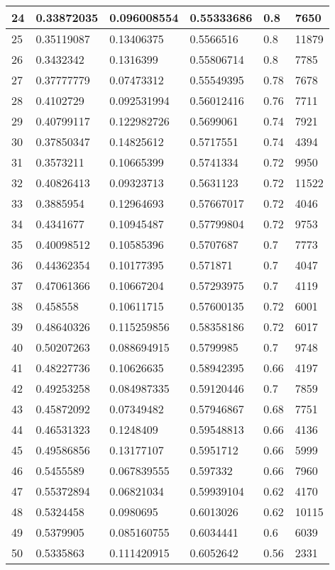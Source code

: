 \begin{longtable}{|l|l|l|l|l|l|}
24 & 0.33872035 & 0.096008554 & 0.55333686 & 0.8 & 7650 \\ \hline 
25 & 0.35119087 & 0.13406375 & 0.5566516 & 0.8 & 11879 \\ \hline 
26 & 0.3432342 & 0.1316399 & 0.55806714 & 0.8 & 7785 \\ \hline 
27 & 0.37777779 & 0.07473312 & 0.55549395 & 0.78 & 7678 \\ \hline 
28 & 0.4102729 & 0.092531994 & 0.56012416 & 0.76 & 7711 \\ \hline 
29 & 0.40799117 & 0.122982726 & 0.5699061 & 0.74 & 7921 \\ \hline 
30 & 0.37850347 & 0.14825612 & 0.5717551 & 0.74 & 4394 \\ \hline 
31 & 0.3573211 & 0.10665399 & 0.5741334 & 0.72 & 9950 \\ \hline 
32 & 0.40826413 & 0.09323713 & 0.5631123 & 0.72 & 11522 \\ \hline 
33 & 0.3885954 & 0.12964693 & 0.57667017 & 0.72 & 4046 \\ \hline 
34 & 0.4341677 & 0.10945487 & 0.57799804 & 0.72 & 9753 \\ \hline 
35 & 0.40098512 & 0.10585396 & 0.5707687 & 0.7 & 7773 \\ \hline 
36 & 0.44362354 & 0.10177395 & 0.571871 & 0.7 & 4047 \\ \hline 
37 & 0.47061366 & 0.10667204 & 0.57293975 & 0.7 & 4119 \\ \hline 
38 & 0.458558 & 0.10611715 & 0.57600135 & 0.72 & 6001 \\ \hline 
39 & 0.48640326 & 0.115259856 & 0.58358186 & 0.72 & 6017 \\ \hline 
40 & 0.50207263 & 0.088694915 & 0.5799985 & 0.7 & 9748 \\ \hline 
41 & 0.48227736 & 0.10626635 & 0.58942395 & 0.66 & 4197 \\ \hline 
42 & 0.49253258 & 0.084987335 & 0.59120446 & 0.7 & 7859 \\ \hline 
43 & 0.45872092 & 0.07349482 & 0.57946867 & 0.68 & 7751 \\ \hline 
44 & 0.46531323 & 0.1248409 & 0.59548813 & 0.66 & 4136 \\ \hline 
45 & 0.49586856 & 0.13177107 & 0.5951712 & 0.66 & 5999 \\ \hline 
46 & 0.5455589 & 0.067839555 & 0.597332 & 0.66 & 7960 \\ \hline 
47 & 0.55372894 & 0.06821034 & 0.59939104 & 0.62 & 4170 \\ \hline 
48 & 0.5324458 & 0.0980695 & 0.6013026 & 0.62 & 10115 \\ \hline 
49 & 0.5379905 & 0.085160755 & 0.6034441 & 0.6 & 6039 \\ \hline 
50 & 0.5335863 & 0.111420915 & 0.6052642 & 0.56 & 2331 \\ \hline 
\end{longtable}